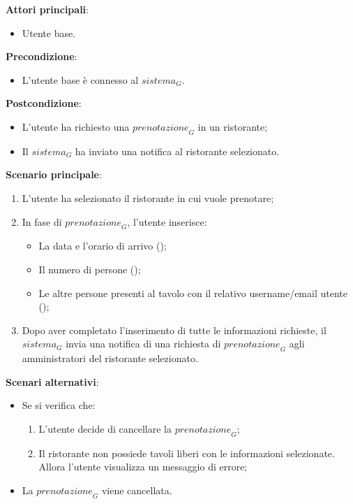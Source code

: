 \textbf{Attori principali}:
\begin{itemize}
    \item Utente base.
\end{itemize}
\textbf{Precondizione}:
\begin{itemize}
    \item L'utente base è connesso al $\textit{sistema}_G$.
\end{itemize}
\textbf{Postcondizione}:
\begin{itemize}
    \item L'utente ha richiesto una $\textit{prenotazione}_G$ in un ristorante;
    \item Il $\textit{sistema}_G$ ha inviato una notifica al ristorante selezionato.
\end{itemize}
\textbf{Scenario principale}:
\begin{enumerate}
    \item L'utente ha selezionato il ristorante in cui vuole prenotare;
    \item In fase di $\textit{prenotazione}_G$, l'utente inserisce:
    \begin{itemize}
        \item La data e l'orario di arrivo ();
        \item Il numero di persone ();
        \item Le altre persone presenti al tavolo con il relativo username/email utente ();
    \end{itemize}
    \item Dopo aver completato l'inserimento di tutte le informazioni richieste, il $\textit{sistema}_G$ invia una notifica di una richiesta di $\textit{prenotazione}_G$ agli amministratori del ristorante selezionato.
\end{enumerate}
\textbf{Scenari alternativi}:
\begin{itemize}
    \item Se si verifica che:
    \begin{enumerate}
        \item L'utente decide di cancellare la $\textit{prenotazione}_G$;
        \item Il ristorante non possiede tavoli liberi con le informazioni selezionate. Allora l'utente visualizza un messaggio di errore;
    \end{enumerate}
    \item La $\textit{prenotazione}_G$ viene cancellata.
\end{itemize}




